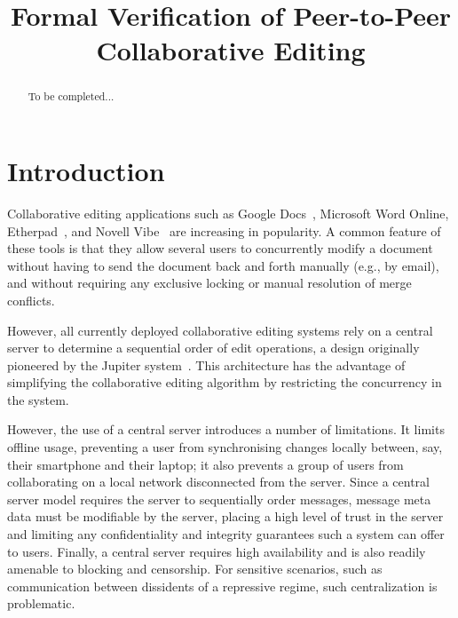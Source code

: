 \documentclass[acmlarge,review,anonymous]{acmart}\settopmatter{printfolios=true}
\begin{document}
\title{Formal Verification of Peer-to-Peer Collaborative Editing}


\maketitle

\begin{abstract}
To be completed...
\end{abstract}


\section{Introduction}
\label{sect.introduction}

Collaborative editing applications such as Google Docs~\cite{DayRichter:2010tt}, Microsoft Word
Online, Etherpad~\cite{Etherpad:2011um}, and Novell Vibe~\cite{Spiewak:2010vw} are increasing in
popularity. A common feature of these tools is that they allow several users to concurrently modify
a document without having to send the document back and forth manually (e.g., by email), and without
requiring any exclusive locking or manual resolution of merge conflicts.

However, all currently deployed collaborative editing systems rely on a central server to determine
a sequential order of edit operations, a design originally pioneered by the Jupiter
system~\cite{Nichols:1995fd}. This architecture has the advantage of simplifying the collaborative
editing algorithm by restricting the concurrency in the system.

However, the use of a central server introduces a number of limitations. It limits offline usage, preventing
a user from synchronising changes locally between, say, their smartphone and their laptop; it also
prevents a group of users from collaborating on a local network disconnected from the server. 
Since a central server model requires the server to sequentially order messages,
message meta data must be modifiable by the server, placing a high level of trust in the server
and limiting any confidentiality and integrity guarantees such a system can offer to users. %
Finally, a central server requires high availability and is also readily amenable to blocking and censorship. 
For sensitive scenarios, such as communication between dissidents of a repressive regime, such centralization is problematic.
\end{document}

